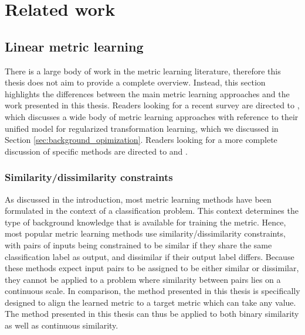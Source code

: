 \section{Related work}

\quad


\subsection{Linear metric learning}

There is a large body of work in the metric learning literature, therefore this thesis does not aim to provide a complete overview. Instead, this section highlights the differences between the main metric learning approaches and the work presented in this thesis. Readers looking for a recent survey are directed to \cite{kulis2012metric}, which discusses a wide body of metric learning approaches with reference to their unified model for regularized transformation learning, which we discussed in Section \ref{sec:background_opimization}. Readers looking for a more complete discussion of specific methods are directed to \cite{bellet2013survey} and \cite{yang2006distance}.


\subsubsection{Similarity/dissimilarity constraints}

As discussed in the introduction, most metric learning methods have been formulated in the context of a classification problem. This context determines the type of background knowledge that is available for training the metric. Hence, most popular metric learning methods use similarity/dissimilarity constraints, with pairs of inputs being constrained to be similar if they share the same classification label as output, and dissimilar if their output label differs. \cite{davis2007information, guillaumin2009you, kostinger2012large} Because these methods expect input pairs to be assigned to be either similar or dissimilar, they cannot be applied to a problem where similarity between pairs lies on a continuous scale. In comparison, the method presented in this thesis is specifically designed to align the learned metric to a target metric which can take any value. The method presented in this thesis can thus be applied to both binary similarity as well as continuous similarity.


